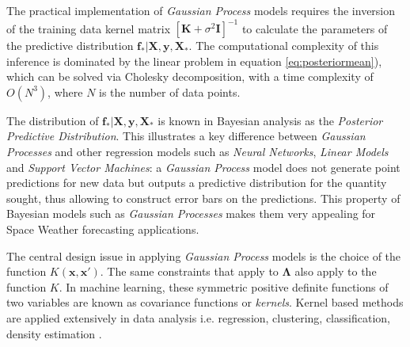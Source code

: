 The practical implementation of \emph{Gaussian Process} models requires the inversion of the training data kernel matrix $[\mathbf{K} + \sigma^{2} \mathbf{I}]^{-1}$ to calculate the parameters of the predictive distribution $\mathbf{f_*}|\mathbf{X},\mathbf{y},\mathbf{X_*}$. The computational complexity of this inference is dominated by the linear problem in equation \ref{eq:posteriormean}), which can be solved via Cholesky decomposition, with a time complexity of $O(N^3)$, where $N$ is the number of data points.

The distribution of $\mathbf{f_*}| \mathbf{X},\mathbf{y},\mathbf{X_*}$ is known in Bayesian analysis as the \emph{Posterior Predictive Distribution}. This illustrates a key difference between \emph{Gaussian Processes} and other regression models such as \emph{Neural Networks}, \emph{Linear Models} and \emph{Support Vector Machines}: a \emph{Gaussian Process} model does not generate point predictions for new data but outputs a predictive distribution for the quantity sought, thus allowing to construct error bars on the predictions. This property of Bayesian models such as \emph{Gaussian Processes} makes them very appealing for Space Weather forecasting applications. 

The central design issue in applying \emph{Gaussian Process} models is the choice of the function 
$K(\mathbf{x}, \mathbf{x}')$. The same constraints that apply to $\mathbf{\Lambda}$ also apply to the 
function $K$. In machine learning, these symmetric positive definite functions of two variables are known as 
covariance functions or \emph{kernels}. Kernel based methods are applied extensively in data analysis 
i.e. regression, clustering, classification, density estimation \citep{Scholkopf:2001:LKS:559923,hofmann2008}.

